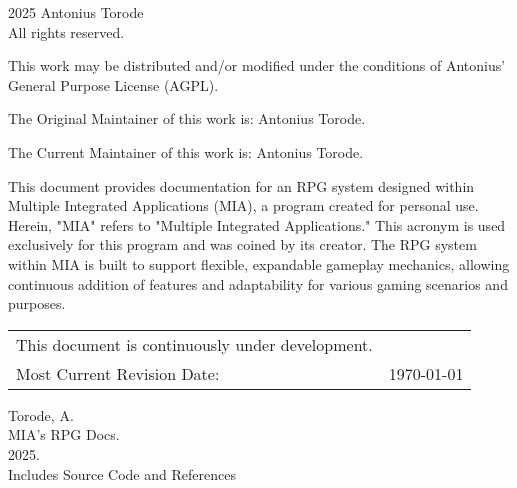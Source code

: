 \pagestyle{empty}
\begingroup
\footnotesize
\parindent 0pt
\parskip \baselineskip
\textcopyright{} 2025 Antonius Torode \\
All rights reserved.

This work may be distributed and/or modified under the conditions of Antonius’ General Purpose License (AGPL).

The Original Maintainer of this work is: Antonius Torode.

The Current Maintainer of this work is: Antonius Torode.

This document provides documentation for an RPG system designed within Multiple Integrated Applications (MIA), a program created for personal use. Herein, "MIA" refers to "Multiple Integrated Applications." This acronym is used exclusively for this program and was coined by its creator. The RPG system within MIA is built to support flexible, expandable gameplay mechanics, allowing continuous addition of features and adaptability for various gaming scenarios and purposes.


\begin{center}
\begin{tabular}{ll}
This document is continuously under development. \\
Most Current Revision Date: &  \today 
\end{tabular}
\end{center}

\vfill

Torode, A.\\
\hspace*{1em} MIA's RPG Docs. \\
\hspace*{2em} 2025. \\
\hspace*{2em} Includes Source Code and References \\


\endgroup
\clearpage
